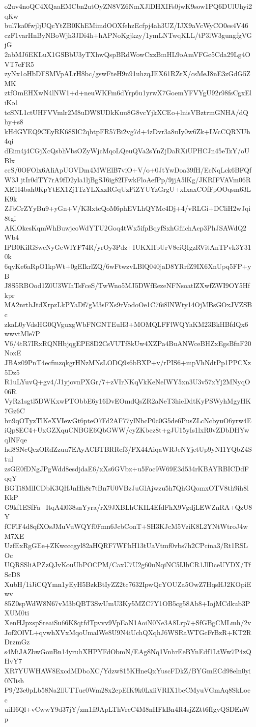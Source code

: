 o2uv4noQC4XQaaEMCbn2utOyZN8VZ6NmXJlDHXIFs0jwK9sow1PQ6DUlUhyi2qKw
bul7ka0fwjljUQcYtZB0KhEMimdOOXfehzEcfpj4ah3UZ/IJX9aVcWyCO0es4V46
czF1varHnByNBoWjh3JDi4h+hAPNoKgjkzy/1ymLNTwqKLL/tP3lW3gungfgVGjG
2abMJ6EKLuX1GSBbU3yTXhwQspBRdWowCxzBmHL9oAmVFGc5Cda29Lg4OVT7eFR5
zyNx1oHbDFSMVpALrH8bc/gswFteH9n91uhzqJEX61RZrX/csMeJ8nE3zGdG5ZMK
ztfOmEHXwN4lNW1+d+neuWKFm6dYrp6u1yrwX7GoemYFVYgU92r98fsCgxEliKo1
tcSNL1ctUHFVVmlr2M8uDW8UDkKuu8G8vcYjkXCEo+lnisVBztrmGNHA/dQhy+s8
kHdGYEQ9CEyRK68SlC2qbtpFR57Bi2vg7d+4zDvr3a8uIy0w6Zk+LVcCQRNUh4qi
dEim4j4CGjXcQsbhVbsOZyWjcMqoLQeuQVa2sYnZjDaRXiUPHCJn45eTzY/oUBlx
ccS/0OFOlx6AliApUOVDm4MWElB7viO+V/o+0JtYwDoa39fH/EcNqLck6BFQfW3J
jtIr0dTY7rA9fD2yla1ljBgSJ6ig82IFwkFloAefPp/9jjA5lKg/JKRIFVAVm06R
XE1I4bah0KpYtEX1Zj1TzYLXxzRGqUzPiZYUYzGrgU+xIxaxCOfFpOOqsm63LK9k
ZJbCrZYyBu9+yGn+V/K3lxtcQoM6phEVLhQYMc4Dj+4/vRLGi+DCliH2wJqi8tgi
AKlOkesKqmWhBuwjcoWdYTU2Goq4tWx5ifpBqyfSxhGfiichAcp3PhJSAWdQ2Wb4
IPB0KiRiSwcNyGeWlYF74R/yrOy3Pdz+IUKXHbUrV8eiQIgzRVitAnTPvk3Y310k
6qyKe6aRpO1kpWt+0gEIkrlZQ/6wFtwzvLBlQ040jaD8YRrfZ9IX6XnUpq5FP+yB
J8S5RBOod1Z0U3WlhTsFceS/TwWno5MJ5DWfEezeNFNsoatlZXwfZWI9OY5Hfkpr
MA2nrthJtdXrpzLkPYaDf7gM3sFXs9rVodoOe1C76i8lNWty14OjMBsGOxJVZSBc
zkaL0yVdsHG0QVguxgWbFNGNTEuH3+MOMQLFFlWQYaKM23BkHBfdQx6wwvtMle7P
V6/4tR7IRxRQNHbjqgEPE8D2CsVUTf8kUw4XZPa4BuANWceBHZxEgsBfnF20NoxE
JBAz09PnT4ecfmzqkgrHNzMNsLODQ9s6bBXP+v/rPIS6+mpVhNdtPp1PPCXz5Dz5
R1uLYuvQ+gv4/J1yjovnPXGr/7+zVIrNKqVkKeNeIWY5xn3U3v57xYj2MNyqO06R
VyRz1sgtl5DWKxwPTObbE6y16DvEOmdQsZR2aNeT3hieDdtKyPSWyhMgyHK7Gz6C
bn9qOTyzTlKeXVIewGt6pteO7Fd2AF77ylNbcP0c0G5de6PusZLcNcbyuO6yrw4E
iQp8EC4+UxGZXquCNBGE6QbGWW/cyZKbcz8t+gJU15yIs1lxR0vZDbDHYwqINFqe
hd8SNcQezORdZzuu7EAyACBTBRRef3/FX44AiqaWRJeNYjetUp9yNI1YQbZ4StuI
zsGE0fDNgJPgWdd8esdjdaE6/xXs6GVbx+u5Foc9W69E3d534rKBAYRBICDdFqqY
BGTi8MlICDbK3QHJnHh8r7tBn7U0VBzJuGlAjwzu5h7QhGQomxOTV8th9ih8lKkP
G9kf1ESfFa+ItqA4l038snYyra/rX9JXBLhCKIL4EfdFhX9VgdjLEWZnRA+QzU8Y
fCFlF4d8qfXOsJMuVuWQYf0Fmn6JcbConT+SH3KJcM5VziK8L2YNtWtroJ4wM7XE
UzfExRgGEe+ZKwcccgyl82aHQRF7WFhH13tUaVtmf0vbs7h2CPcina3/Rt1RSLOc
UQRSSliAPZzQJvKouUbPOCPM/CaxU7U2g60uNqiNC5IJhCR1JlDceUYDX/TfScD8
XubH/1iJiCQYmn1yEyH5BzkBtIyZZ2tc7632IpwQcYOUZa5OwZ7HqsHJ2KOpiEwv
85Z0spWdW8N67vM3bQBT3SwUmU3Ky5MZC7Y1OB5cg58Ab8+IojMCdkub3PXUM0ti
XenHJpxspSreaiSu66K8qtfdTpvvv9VpEaN1AoiN0Ne3A8Lrp7+SfGBgCMLmh/2v
Jof2OlVL+qvwhXVxMqoUmalWe8U9N4iUchQXqhJ6WSRaWTGcFrBzR+KT2RDrzmGz
s4MiJAZbwGouBn14yruhXHPYFdObmN/EAg8Nq1VnhrEeBYnEdf1LtWw7P4zQHvY7
XR7YUWHAW8ExcdMDboXC/Ydzw815KHneQxYuscFDkZ/BYGmECd98eln0yi0NIish
P9/23e0pLb58Na2llUTTuc0Wm28x2epEIK9k0LxiiVRIX1beCMyuVGmAq8SkLoec
uiH6Ql+vCwwY9d37jY/zm1fi9ApLThVrcC4M8nHFkBn4R4sjZZtt6fIgvQSDEnWp
